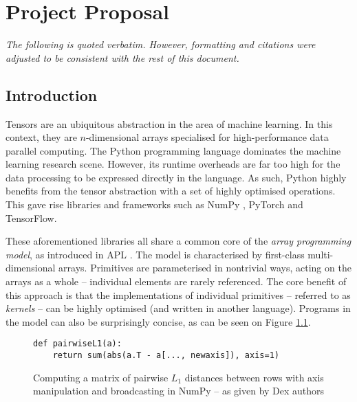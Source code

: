 \chapter{Project Proposal}

\newcommand{\dontcite}[1]{}

\textit{The following is quoted verbatim. However, formatting and citations were adjusted to be consistent with the rest of this document.}

\section{Introduction}

Tensors are an ubiquitous abstraction in the area of machine learning. In this context, they are $n$-dimensional arrays specialised for high-performance data parallel computing. The Python programming language dominates the machine learning research scene. However, its runtime overheads are far too high for the data processing to be expressed directly in the language. As such, Python highly benefits from the tensor abstraction with a set of highly optimised operations. This gave rise libraries and frameworks such as NumPy \cite{harris2020array}, PyTorch and TensorFlow.

These aforementioned libraries all share a common core of the \textit{array programming model}, as introduced in APL \cite{iverson1962programming}. The model is characterised by first-class multi-dimensional arrays. Primitives are parameterised in nontrivial ways, acting on the arrays as a whole -- individual elements are rarely referenced. The core benefit of this approach is that the implementations of individual primitives -- referred to as \textit{kernels} -- can be highly optimised (and written in another language). Programs in the model can also be surprisingly concise, as can be seen on Figure \ref{fig:pairwise-l1-numpy}. 

\begin{figure}[h]
    \centering
    \begin{minipage}{0.65\textwidth}
    \begin{verbatim}
def pairwiseL1(a):
    return sum(abs(a.T - a[..., newaxis]), axis=1) 
    \end{verbatim}
    \end{minipage}
    \caption{Computing a matrix of pairwise $L_1$ distances between rows with axis manipulation and broadcasting in NumPy -- as given by Dex authors \cite{maclaurin2019dex}}
    \label{fig:pairwise-l1-numpy}
\end{figure}

